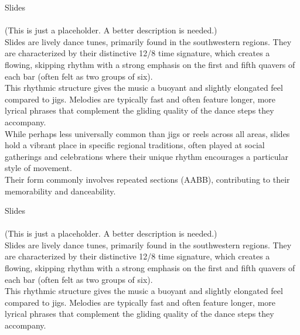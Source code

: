 \begin{multicols}{2}
    \Huge{Slides}\\
    \vspace{1cm}\\
    \normalsize{
      \noindent 
      (This is just a placeholder. A better description is needed.)\\

      Slides are lively dance tunes, primarily found in the southwestern regions. 
      They are characterized by their distinctive 12/8 time signature, which creates 
      a flowing, skipping rhythm with a strong emphasis on the first and fifth quavers 
      of each bar (often felt as two groups of six).\\
      
      This rhythmic structure gives the music a buoyant and slightly elongated feel 
      compared to jigs. Melodies are typically fast and often feature longer, 
      more lyrical phrases that complement the gliding quality of the dance steps 
      they accompany.\\ 
      
      While perhaps less universally common than jigs or reels across all areas, 
      slides hold a vibrant place in specific regional traditions, often played 
      at social gatherings and celebrations where their unique rhythm encourages 
      a particular style of movement.\\
      
      Their form commonly involves repeated sections (AABB), contributing to their 
      memorability and danceability.
    }

    \newcolumn

    \Huge{Slides}\\
    \vspace{1cm}\\
    \normalsize{
      \noindent
      (This is just a placeholder. A better description is needed.)\\

      Slides are lively dance tunes, primarily found in the southwestern regions. 
      They are characterized by their distinctive 12/8 time signature, which creates 
      a flowing, skipping rhythm with a strong emphasis on the first and fifth quavers 
      of each bar (often felt as two groups of six).\\
      
      This rhythmic structure gives the music a buoyant and slightly elongated feel 
      compared to jigs. Melodies are typically fast and often feature longer, 
      more lyrical phrases that complement the gliding quality of the dance steps 
      they accompany.\\ 
      
}
\end{multicols}
